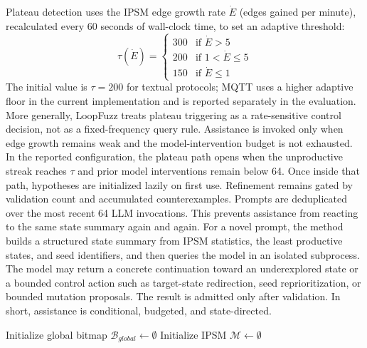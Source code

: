 \documentclass[conference]{IEEEtran}
\begin{document}
Plateau detection uses the IPSM edge growth rate $\dot{E}$ (edges gained per minute), recalculated every 60 seconds of wall-clock time, to set an adaptive threshold:
\[
\tau(\dot{E}) = \begin{cases}
300 & \text{if } \dot{E} > 5 \\
200 & \text{if } 1 < \dot{E} \le 5 \\
150 & \text{if } \dot{E} \le 1
\end{cases}
\]
The initial value is $\tau{=}200$ for textual protocols; MQTT uses a higher adaptive floor in the current implementation and is reported separately in the evaluation. More generally, LoopFuzz treats plateau triggering as a rate-sensitive control decision, not as a fixed-frequency query rule. Assistance is invoked only when edge growth remains weak and the model-intervention budget is not exhausted. In the reported configuration, the plateau path opens when the unproductive streak reaches $\tau$ and prior model interventions remain below 64. Once inside that path, hypotheses are initialized lazily on first use. Refinement remains gated by validation count and accumulated counterexamples. Prompts are deduplicated over the most recent 64 LLM invocations. This prevents assistance from reacting to the same state summary again and again. For a novel prompt, the method builds a structured state summary from IPSM statistics, the least productive states, and seed identifiers, and then queries the model in an isolated subprocess. The model may return a concrete continuation toward an underexplored state or a bounded control action such as target-state redirection, seed reprioritization, or bounded mutation proposals. The result is admitted only after validation. In short, assistance is conditional, budgeted, and state-directed.

\begin{algorithm}[htbp]
\caption{Runtime-Validated Plateau Recovery in LoopFuzz}
\label{alg:fuzz}
\SetAlgoLined
\small
{}
Initialize global bitmap $\mathcal{B}_{global} \leftarrow \emptyset$\;
Initialize IPSM $\mathcal{M} \leftarrow \emptyset$\;
\end{algorithm}
\end{document}
